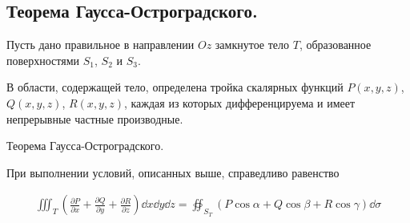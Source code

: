 \subsection{%
  Теорема Гаусса-Остроградского.%
}

\begin{twocolumns}
  
  \columnbreak

  Пусть дано правильное в направлении \(Oz\) замкнутое тело \(T\), образованное
  поверхностями \(S_{1}\), \(S_{2}\) и \(S_{3}\).

  В области, содержащей тело, определена тройка скалярных функций
  \(P(x, y, z)\), \(Q(x, y, z)\), \(R(x, y, z)\), каждая из которых
  дифференцируема и имеет непрерывные частные производные.
\end{twocolumns}
  
\begin{theorem}\label{GO}
  Теорема Гаусса-Остроградского.

  При выполнении условий, описанных выше, справедливо равенство
  
  \begin{align*}
    \iiint_{T} \left(
      \frac{\partial P}{\partial x} +
      \frac{\partial Q}{\partial y} +
      \frac{\partial R}{\partial z}
    \right) \dd x \dd y \dd z
    =
    \oiint_{S_{T}} \left(
      P \cos \alpha +
      Q \cos \beta +
      R \cos \gamma
    \right) \dd \sigma
  \end{align*}
\end{theorem}  
